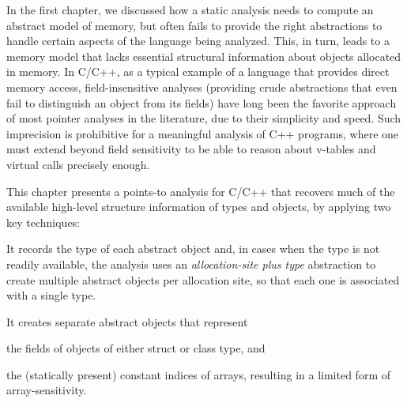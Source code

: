 \label{chapter:structsens}

In the first chapter, we discussed how a static analysis needs to
compute an abstract model of memory, but often fails to provide
the right abstractions to handle certain aspects of the language being
analyzed. This, in turn, leads to a memory model that lacks essential
structural information about objects allocated in memory. In C/C++, as
a typical example of a language that provides direct memory access,
field-insensitive analyses (providing crude abstractions that even fail
to distinguish an object from its fields) have long been the favorite
approach of most pointer analyses in the literature, due to their
simplicity and speed.
%
Such imprecision is prohibitive for a meaningful analysis of C++
programs, where one must extend beyond field sensitivity to be able
to reason about v-tables and virtual calls precisely enough.

This chapter presents a points-to analysis for C/C++ that recovers
much of the available high-level structure information of types and
objects, by applying two key techniques:
\begin{inparaenum}[(1)]
\item It records the type of each abstract object and, in cases
  when the type is not readily available, the analysis uses an
  \emph{allocation-site plus type} abstraction to create multiple
  abstract objects per allocation site, so that each one is
  associated with a single type.
\item It creates separate abstract objects that represent
  \begin{inparaenum}[(a)]
  \item the fields of objects of either struct or class type, and
  \item the (statically present) constant indices of arrays,
    resulting in a limited form of array-sensitivity.
  \end{inparaenum}
\end{inparaenum}





